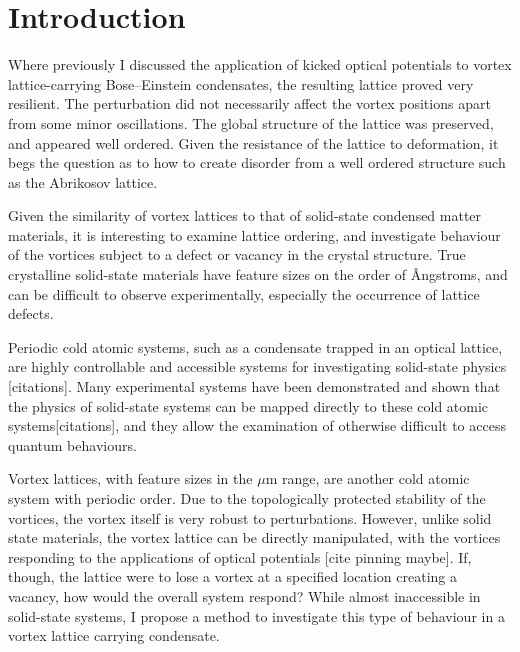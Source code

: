 \section{Introduction}\label{sec:ch6_intro}
Where previously I discussed the application of kicked optical potentials to vortex lattice-carrying Bose--Einstein condensates, the resulting lattice proved very resilient. The perturbation did not necessarily affect the vortex positions apart from some minor oscillations. The global structure of the lattice was preserved, and appeared well ordered. Given the resistance of the lattice to deformation, it begs the question as to how to create disorder from a well ordered structure such as the Abrikosov lattice.

Given the similarity of vortex lattices to that of solid-state condensed matter materials, it is interesting to examine lattice ordering, and investigate behaviour of the vortices subject to a defect or vacancy in the crystal structure. True crystalline solid-state materials have feature sizes on the order of \^Angstroms, and can be difficult to observe experimentally, especially the occurrence of lattice defects.

Periodic cold atomic systems, such as a condensate trapped in an optical lattice, are highly controllable and accessible systems for investigating solid-state physics [citations]. Many experimental systems have been demonstrated and shown that the physics of solid-state systems can be mapped directly to these cold atomic systems[citations], and they allow the examination of otherwise difficult to access quantum behaviours.

Vortex lattices, with feature sizes in the $\mu$m range, are another cold atomic system with periodic order. Due to the topologically protected stability of the vortices, the vortex itself is very robust to perturbations. However, unlike solid state materials, the vortex lattice can be directly manipulated, with the vortices responding to the applications of optical potentials [cite pinning maybe]. If, though, the lattice were to lose a vortex at a specified location creating a vacancy, how would the overall system respond? While almost inaccessible in solid-state systems, I propose a method to investigate this type of behaviour in a vortex lattice carrying condensate.

